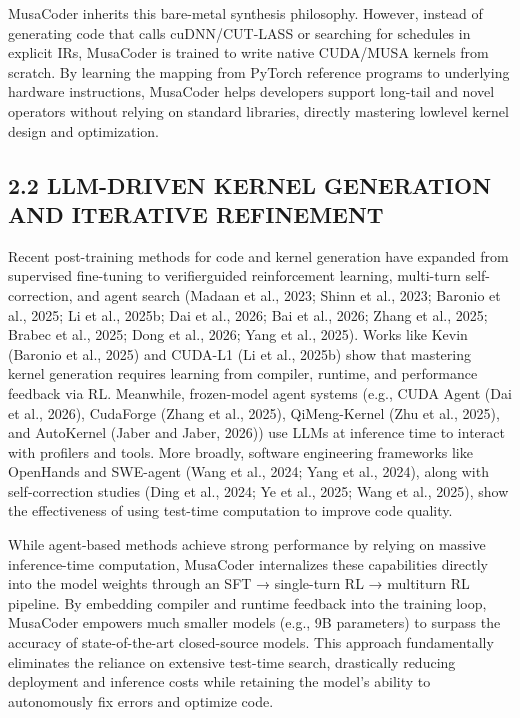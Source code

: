\documentclass[
  10
]{article}
\begin{document}
MusaCoder inherits this bare-metal synthesis philosophy. However,
instead of generating code that calls cuDNN/CUT-LASS or searching for
schedules in explicit IRs, MusaCoder is trained to write native
CUDA/MUSA kernels from scratch. By learning the mapping from PyTorch
reference programs to underlying hardware instructions, MusaCoder helps
developers support long-tail and novel operators without relying on
standard libraries, directly mastering lowlevel kernel design and
optimization.

\subsection{2.2 LLM-DRIVEN KERNEL GENERATION AND ITERATIVE
REFINEMENT}\label{llm-driven-kernel-generation-and-iterative-refinement}

Recent post-training methods for code and kernel generation have
expanded from supervised fine-tuning to verifierguided reinforcement
learning, multi-turn self-correction, and agent search (Madaan et al.,
2023; Shinn et al., 2023; Baronio et al., 2025; Li et al., 2025b; Dai et
al., 2026; Bai et al., 2026; Zhang et al., 2025; Brabec et al., 2025;
Dong et al., 2026; Yang et al., 2025). Works like Kevin (Baronio et al.,
2025) and CUDA-L1 (Li et al., 2025b) show that mastering kernel
generation requires learning from compiler, runtime, and performance
feedback via RL. Meanwhile, frozen-model agent systems (e.g., CUDA Agent
(Dai et al., 2026), CudaForge (Zhang et al., 2025), QiMeng-Kernel (Zhu
et al., 2025), and AutoKernel (Jaber and Jaber, 2026)) use LLMs at
inference time to interact with profilers and tools. More broadly,
software engineering frameworks like OpenHands and SWE-agent (Wang et
al., 2024; Yang et al., 2024), along with self-correction studies (Ding
et al., 2024; Ye et al., 2025; Wang et al., 2025), show the
effectiveness of using test-time computation to improve code quality.

While agent-based methods achieve strong performance by relying on
massive inference-time computation, MusaCoder internalizes these
capabilities directly into the model weights through an SFT →
single-turn RL → multiturn RL pipeline. By embedding compiler and
runtime feedback into the training loop, MusaCoder empowers much smaller
models (e.g., 9B parameters) to surpass the accuracy of state-of-the-art
closed-source models. This approach fundamentally eliminates the
reliance on extensive test-time search, drastically reducing deployment
and inference costs while retaining the model's ability to autonomously
fix errors and optimize code.
\end{document}
